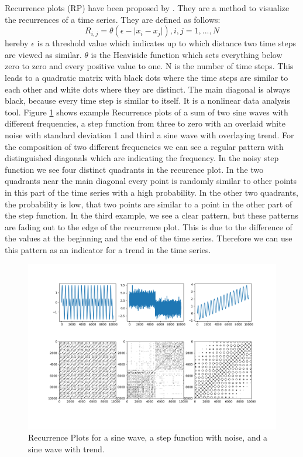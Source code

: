\documentclass{article}
\begin{document}
Recurrence plots (RP) have been proposed by \cite{Eckmann}. They are a method to visualize the recurrences of a time series.
They are defined as follows:
$$R_{i,j} = \theta(\epsilon - \lvert x_i - x_j \rvert), i,j = 1,...,N$$
hereby $\epsilon$ is a threshold value which indicates up to which distance two time steps are viewed as similar.
$\theta$ is the Heaviside function which sets everything below zero to zero and every positive value to one.
N is the number of time steps.
This leads to a quadratic matrix with black dots where the time steps are similar to each other and white dots where they are distinct.
The main diagonal is always black, because every time step is similar to itself.
It is a nonlinear data analysis tool.
Figure \ref{rplots} shows example Recurrence plots of a sum of two sine waves with different frequencies,
a step function from three to zero with an overlaid white noise with standard deviation 1 and third a sine wave with overlaying trend.
For the composition of two different frequencies we can see a regular pattern with distinguished diagonals which are indicating the frequency.
In the noisy step function we see four distinct quadrants in the recurence plot.
In the two quadrants near the main diagonal every point is randomly similar to other points in this part of the time series with a high probability.
In the other two quadrants, the probability is low, that two points are similar to a point in the other part of the step function.
In the third example, we see a clear pattern, but these patterns are fading out to the edge of the recurrence plot.
This is due to the difference of the values at the beginning and the end of the time series.
Therefore we can use this pattern as an indicator for a trend in the time series.

\begin{figure}
  \includegraphics[width=\textwidth]{figs/rp_methods.png}
  \caption{Recurrence Plots for a sine wave, a step function with noise, and a sine wave with trend.}
  \label{rplots}
\end{figure}
\end{document}
